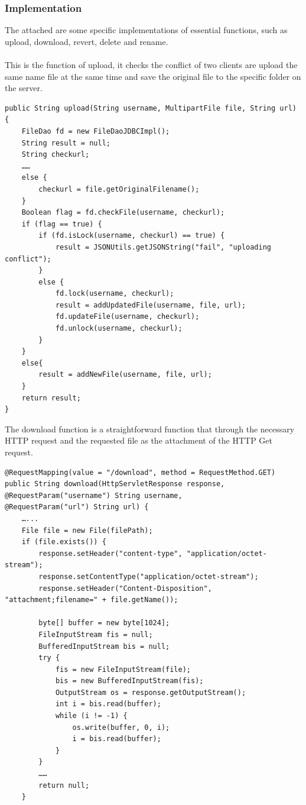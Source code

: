 \documentclass[11pt]{article}
\begin{document}
\subsubsection{Implementation}
The attached are some specific implementations of essential functions, such as upload, download, revert, delete and rename.
\\
\\
This is the function of upload, it checks the conflict of two clients are upload the same name file at the same time and save the original file to the specific folder on the server.

\begin{lstlisting}
public String upload(String username, MultipartFile file, String url) {
	FileDao fd = new FileDaoJDBCImpl();
	String result = null;
	String checkurl;
	…… 
	else {
		checkurl = file.getOriginalFilename();
	}
	Boolean flag = fd.checkFile(username, checkurl);
	if (flag == true) {
		if (fd.isLock(username, checkurl) == true) {
			result = JSONUtils.getJSONString("fail", "uploading conflict");
		}
		else {
			fd.lock(username, checkurl);
			result = addUpdatedFile(username, file, url);
			fd.updateFile(username, checkurl);
			fd.unlock(username, checkurl);
		}
	}
	else{
		result = addNewFile(username, file, url);
	}
	return result;
}
\end{lstlisting}

The download function is a straightforward function that through the necessary HTTP request and the requested file as the attachment of the HTTP Get request.


\begin{lstlisting}
@RequestMapping(value = "/download", method = RequestMethod.GET)
public String download(HttpServletResponse response,
@RequestParam("username") String username,
@RequestParam("url") String url) {
	…...
	File file = new File(filePath);
	if (file.exists()) {
		response.setHeader("content-type", "application/octet-stream");
		response.setContentType("application/octet-stream");
		response.setHeader("Content-Disposition", "attachment;filename=" + file.getName());
		
		byte[] buffer = new byte[1024];
		FileInputStream fis = null;
		BufferedInputStream bis = null;
		try {
			fis = new FileInputStream(file);
			bis = new BufferedInputStream(fis);
			OutputStream os = response.getOutputStream();
			int i = bis.read(buffer);
			while (i != -1) {
				os.write(buffer, 0, i);
				i = bis.read(buffer);
			}
		}
		…… 
		return null;
	}
\end{lstlisting}
\end{document}
